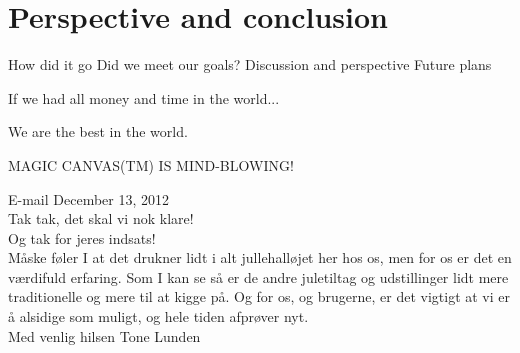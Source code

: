 \chapter{Perspective and conclusion}
How did it go
Did we meet our goals?
Discussion and perspective
Future plans

If we had all money and time in the world...

We are the best in the world.

MAGIC CANVAS(TM) IS MIND-BLOWING!

\begin{fancyquotes}
E-mail December 13, 2012\\
Tak tak, det skal vi nok klare!\\

Og tak for jeres indsats!\\
M{\aa}ske f{\o}ler I at det drukner lidt i alt jullehall{\o}jet her hos os, men for os er det en v{\ae}rdifuld erfaring. Som I kan se s{\aa} er de andre juletiltag og udstillinger lidt mere traditionelle og mere til at kigge p{\aa}. Og for os, og brugerne, er det vigtigt at vi er {\aa} alsidige som muligt, og hele tiden afpr{\o}ver nyt.\\

Med venlig hilsen
Tone Lunden
\end{fancyquotes}